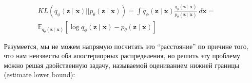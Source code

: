 \documentclass{article}
\begin{document}
\begin{gather*}
    KL(q_\phi(\mathbf{z} \mid \mathbf{x}) || p_\theta(\mathbf{z} \mid \mathbf{x})) 
    = \int q_\phi(\mathbf{z} \mid \mathbf{x}) \frac{q_\phi(\mathbf{z} \mid \mathbf{x})}{p_\theta(\mathbf{z} \mid \mathbf{x})}~d\mathbf{x} =\\
    \mathbb{E}_{q_\theta(\mathbf{z} \mid \mathbf{x})} \left[\log q_\phi(\mathbf{z} \mid \mathbf{x}) - p_\theta(\mathbf{z} \mid \mathbf{x})\right]
\end{gather*}

Разумеется, мы не можем напрямую посчитать это ``расстояние'' по причине того, что нам неизвесты оба апостериорных распределения, но решить
эту проблему можно решая двойственную задачу, называемой оцениванием нижней границы (estimate lower bound):

\newpage
 

\end{document}
